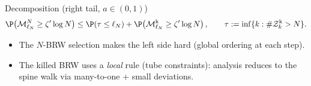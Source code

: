 \begin{block}{Decomposition (right tail, $a\in(0,1)$)}
\[
    \P\!\left(\mathcal M^N_{\ell_N}\ge \zeta'\log N\right)
    \le
    \P(\tau\le \ell_N)
    +
    \P\!\left(\mathcal M^{\mathrm k}_{\ell_N}\ge \zeta'\log N\right),
    \qquad
    \tau:=\inf\{k:\#\mathcal Z^{\mathrm k}_k>N\}.
\]
\end{block}
\vspace{-1mm}
\begin{itemize}
    \item The $N$-BRW selection makes the left side hard (global ordering at each step).
    \item The killed BRW uses a \emph{local} rule (tube constraints): analysis reduces to the spine walk via many-to-one + small deviations.
\end{itemize}


